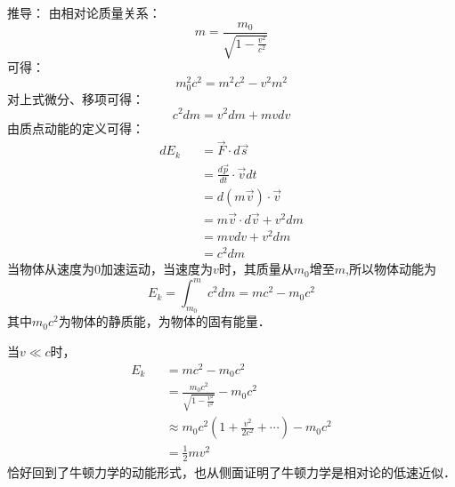 \documentclass[11pt]{article}
\newcommand{\be}{\begin{equation}}
\newcommand{\ee}{\end{equation}}
\newcommand{\bea}{\setlength\arraycolsep{2pt} \begin{eqnarray}}
\newcommand{\eea}{\end{eqnarray}}
\numberwithin{equation}{section}
\begin{document}
\begin{CJK}{GBK}{song}
推导：
由相对论质量关系：
\be
m=\frac{m_0}{\sqrt{1-\frac{v^2}{c^2}}}
\ee
可得：
\be
m_0^2 c^2=m^2c^2-v^2m^2
\ee
对上式微分、移项可得：
\be
c^2dm=v^2dm+mvdv
\ee
由质点动能的定义可得：
\bea
dE_k&&=\vec{F}\cdot d \vec{s} \\
&&=\frac{d\vec{p}}{dt}\cdot \vec{v} dt\\
&&=d(m \vec{v})\cdot \vec{v} \\
&&=m \vec{v} \cdot d\vec{v}+v^2 dm \\
&&=mvdv+v^2dm\\
&&=c^2dm
\eea
当物体从速度为0加速运动，当速度为$v$时，其质量从$m_0$增至$m$,所以物体动能为
\be
E_k=\int^m_{m_0} c^2 dm=mc^2-m_0c^2
\ee
其中$m_0c^2$为物体的静质能，为物体的固有能量．

当$v\ll c$时，
\bea
E_k&&=mc^2-m_0c^2 \\
&&=\frac{m_0c^2}{\sqrt{1-\frac{v^2}{c^2}}}-m_0c^2 \\
&&\approx m_0c^2(1+\frac{v^2}{2c^2}+ \cdots)-m_0c^2 \\
&&=\frac{1}{2}m v^2
\eea
恰好回到了牛顿力学的动能形式，也从侧面证明了牛顿力学是相对论的低速近似．
\end{CJK}
\end{document}

